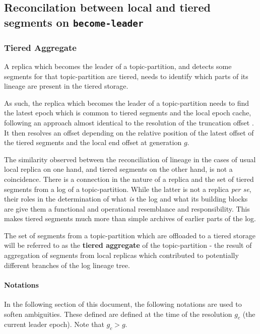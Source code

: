 \documentclass{article}
\begin{document}
\subsection{Reconcilation between local and tiered segments on \texttt{become-leader}}

\subsubsection{Tiered Aggregate}

A replica which becomes the leader of a topic-partition, and detects some segments for that topic-partition are tiered, needs to identify which parts of its lineage are present in the tiered storage. 

As such, the replica which becomes the leader of a topic-partition needs to find the latest epoch which is common to tiered segments and the local epoch cache, following an approach almost identical to the resolution of the truncation offset \cite{KIP279}. It then resolves an offset depending on the relative position of the latest offset of the tiered segments and the local end offset at generation $g$.

The similarity observed between the reconciliation of lineage in the cases of usual local replica on one hand, and tiered segments on the other hand, is not a coincidence. There is a connection in the nature of a replica and the set of tiered segments from a log of a topic-partition. While the latter is not a replica \textit{per se}, their roles in the determination of what \textit{is} the log and what its building blocks are give them a functional and operational resemblance and responsibility. This makes tiered segments much more than simple archives of earlier parts of the log.

The set of segments from a topic-partition which are offloaded to a tiered storage will be referred to as the \textbf{tiered aggregate} of the topic-partition - the result of aggregation of segments from local replicas which contributed to potentially different branches of the log lineage tree.

\paragraph{Notations}
In the following section of this document, the following notations are used to soften ambiguities. These defined are defined at the time of the resolution $g_c$ (the current leader epoch). Note that $g_c > g$.
\end{document}
